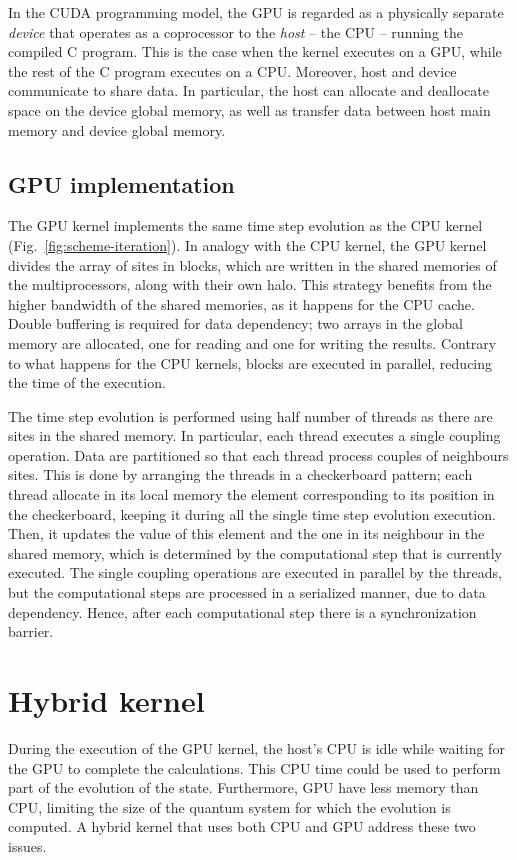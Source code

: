 In the CUDA programming model, the GPU is regarded as a physically separate \textit{device} that operates as a coprocessor to the \textit{host} -- the CPU -- running the compiled C program. This is the case when the kernel executes on a GPU, while the rest of the C program executes on a CPU. Moreover, host and device communicate to share data. In particular, the host can allocate and deallocate space on the device global memory, as well as transfer data between host main memory and device global memory.

\subsection{GPU implementation}
The GPU kernel implements the same time step evolution as the CPU kernel (Fig.~\ref{fig:scheme-iteration}). In analogy with the CPU kernel, the  GPU kernel divides the array of sites in blocks, which are written in the shared memories of the multiprocessors, along with their own halo. This strategy benefits from the higher bandwidth of the shared memories, as it happens for the CPU cache. Double buffering is required for data dependency; two arrays in the global memory are allocated, one for reading and one for writing the results. Contrary to what happens for the CPU kernels, blocks are executed in parallel, reducing the time of the execution. 

The time step evolution is performed using half number of threads as there are sites in the shared memory. In particular, each thread executes a single coupling operation. Data are partitioned so that each thread process couples of neighbours sites. This is done by arranging the threads in a checkerboard pattern; each thread allocate in its local memory the element corresponding to its position in the checkerboard, keeping it during all the single time step evolution execution. Then, it updates the value of this element and the one in its neighbour in the shared memory, which is determined by the computational step that is currently executed. The single coupling operations are executed in parallel by the threads, but the computational steps are processed in a serialized manner, due to data dependency. Hence, after each computational step there is a synchronization barrier. 

\section{Hybrid kernel}
During the execution of the GPU kernel, the host's CPU is idle while waiting for the GPU to complete the calculations. This CPU time could be used to perform part of the evolution of the state. Furthermore, GPU have less memory than CPU, limiting the size of the quantum system for which the evolution is computed. A hybrid kernel that uses both CPU and GPU address these two issues.

